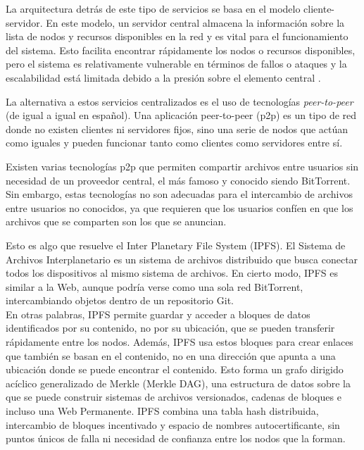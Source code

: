 La arquitectura detrás de este tipo de servicios se basa en el modelo cliente-servidor. En este modelo,
un servidor central almacena la información sobre la lista de nodos y recursos disponibles en la red y es vital para el
funcionamiento del sistema. Esto facilita encontrar rápidamente los nodos o recursos disponibles, pero el sistema es relativamente
vulnerable en términos de fallos o ataques y la escalabilidad está limitada debido a la presión sobre el elemento central \cite{vybochPeertopeerProtocolsFile2017}.

La alternativa a estos servicios centralizados es el uso de tecnologías \textit{peer-to-peer} (de igual a igual en español).
Una aplicación peer-to-peer (p2p) es un tipo de red donde no existen clientes ni servidores fijos,
sino una serie de nodos que actúan como iguales y pueden funcionar tanto como clientes como servidores entre sí.

Existen varias tecnologías p2p que permiten compartir archivos entre usuarios sin necesidad de un proveedor central, el
más famoso y conocido siendo BitTorrent\cite{BitTorrentProtocol}. Sin embargo, estas tecnologías no son adecuadas para el intercambio de archivos entre
usuarios no conocidos, ya que requieren que los usuarios confíen en que los archivos que se comparten son los que se anuncian.

Esto es algo que resuelve el Inter Planetary File System (IPFS).
El Sistema de Archivos Interplanetario es un sistema de archivos distribuido que busca conectar todos los dispositivos
al mismo sistema de archivos. En cierto modo, IPFS es similar a la Web, aunque podría verse como una sola red
BitTorrent, intercambiando objetos dentro de un repositorio Git.
\\En otras palabras, IPFS permite guardar y acceder a bloques de
datos identificados por su contenido, no por su ubicación, que se pueden transferir rápidamente entre los nodos. Además, IPFS
usa estos bloques para crear enlaces que también se basan en el contenido, no en una dirección que apunta a una ubicación donde se puede encontrar el contenido.
Esto forma un grafo dirigido acíclico generalizado de Merkle (Merkle DAG), una estructura de datos sobre la que se puede
construir sistemas de archivos versionados, cadenas de bloques e incluso una Web Permanente. IPFS combina una tabla hash
distribuida, intercambio de bloques incentivado y espacio de nombres autocertificante, sin puntos únicos de falla ni necesidad
de confianza entre los nodos que la forman\cite{benetIPFSContentAddressed2014}.



